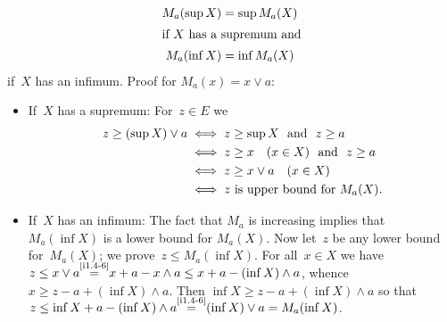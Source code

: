 \documentclass[main.tex]{subfiles}
\begin{document}
\begin{enumerate}
\begin{align*}
M_a(\sup X) &= \sup M_a(X) \\
\intertext{%
if $X$ has a supremum and}
M_a(\inf X) &= \inf M_a(X)
\end{align*}
if~$X$ has an infimum.
Proof for $M_a(x)=x\vee a$:
\begin{itemize}
\item %
If~$X$ has a supremum:  
For~$z\in E$ we
\begin{align*}
z\ge (\sup X)\vee a  
  & \iff z\ge \sup X\ \textnormal{ and }\  z\ge a \\
  & \iff z\ge x\quad (x\in X)\ \textnormal{ and }\  z\ge a\\
  & \iff z\ge x\vee a\quad (x\in X) \\
  & \iff z\textnormal{ is upper bound for }M_a(X)\textnormal{.}
\end{align*}
\item %
If~$X$ has an infimum: 
The fact that $M_a$ is increasing 
implies that $M_a(\inf X)$ is a lower bound
for $M_a(X)$.
Now let~$z$
be any lower bound for~$M_a(X)$;
we prove~$z\leq M_a(\inf X)$.
For all~$x\in X$
we have
$z\leq x\vee a 
\smash{\stackrel{\textnormal{\ref{i1.4-6}}}{=}}
x+a - x\wedge a
\leq x+a-(\inf X)\wedge a$,
whence
$x\ge z-a+(\inf X)\wedge a$.
Then $\inf X\geq z-a+(\inf X)\wedge a$
so that 
$z\leq \inf X +a - (\inf X)\wedge a
\smash{\stackrel{\textnormal{\ref{i1.4-6}}}{=}}
(\inf X)\vee a = M_a(\inf X)$.
\end{itemize}
\end{enumerate}
\end{document}
